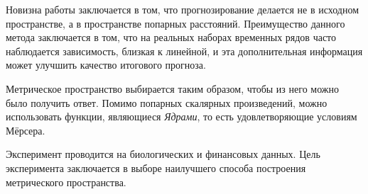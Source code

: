 \documentclass{article}
\begin{document}
	Новизна работы заключается в том, что прогнозирование делается не в исходном пространстве, а в пространстве попарных расстояний. Преимущество данного метода заключается в том, что на реальных наборах временных рядов часто наблюдается зависимость, близкая к линейной, и эта дополнительная информация может улучшить качество итогового прогноза.
	
	Метрическое пространство выбирается таким образом, чтобы из него можно было получить ответ. Помимо попарных скалярных произведений, можно использовать функции, являющиеся \textit{Ядрами}, то есть удовлетворяющие условиям Мёрсера.
	
	Эксперимент проводится на биологических и финансовых данных. Цель эксперимента заключается в выборе наилучшего способа построения метрического пространства.








\end{document}
